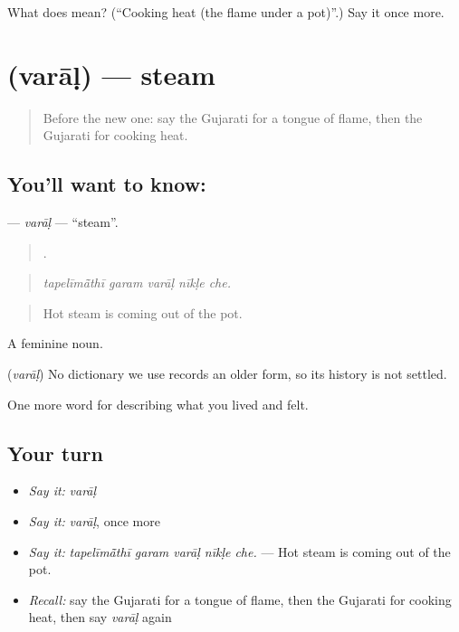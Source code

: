 \begin{tcolorbox}[breakable,colback=teal!4,colframe=teal!35!black,title={Before you move on}]
What does  mean? (\textquotedblleft{}Cooking heat (the flame under a pot)\textquotedblright{}.) Say it once more.
\end{tcolorbox}
\section[\texorpdfstring{\gu{વરાળ} (varāḷ)}{વરાળ (varāḷ)}]{ (varāḷ) — steam}

\label{lesson:GU-C519-varal}



\begin{quote}
Before the new one: say the Gujarati for a tongue of flame, then the Gujarati for cooking heat.
\end{quote}

\subsection*{You'll want to know: }
\textbf{} — \emph{varāḷ} — \textquotedblleft{}steam\textquotedblright{}.

\begin{quote}
    .
\end{quote}

\begin{quote}
\emph{tapelīmā̃thī garam varāḷ nīkḷe che.}
\end{quote}

\begin{quote}
Hot steam is coming out of the pot.
\end{quote}

A feminine noun.

\begin{cousinweb}
\textbf{} (\emph{varāḷ}) No dictionary we use records an older form, so its history is not settled.
\end{cousinweb}

\begin{grammarlens}[title={What you've built}]
One more word for describing what you lived and felt.
\end{grammarlens}

\subsection*{Your turn}
\begin{itemize}
\raggedright
  \item \emph{Say it:} \emph{varāḷ}
  \item \emph{Say it:} \emph{varāḷ}, once more
  \item \emph{Say it:} \emph{tapelīmā̃thī garam varāḷ nīkḷe che.} — Hot steam is coming out of the pot.
  \item \emph{Recall:} say the Gujarati for a tongue of flame, then the Gujarati for cooking heat, then say \emph{varāḷ} again
\end{itemize}

